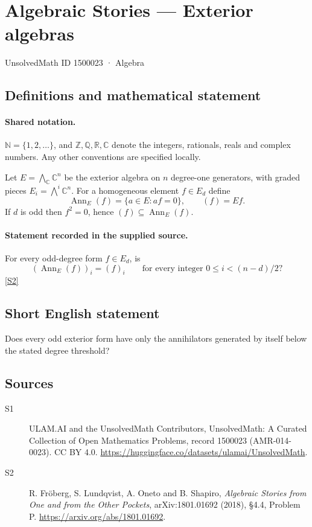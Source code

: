 \documentclass[11pt]{article}
\newcommand{\sref}[2]{\hyperlink{source:#1:#2}{[S#2]}}
\begin{document}
\setcounter{section}{1500022}
\section{Algebraic Stories — Exterior algebras}\label{1500023}
{\small\sffamily UnsolvedMath ID 1500023 · Algebra}
\subsection{Definitions and mathematical statement}

\paragraph{Shared notation.}$\mathbb N=\{1,2,\ldots\}$, and $\mathbb Z,\mathbb Q,\mathbb R,\mathbb C$ denote the integers, rationals, reals and complex numbers. Any other conventions are specified locally.


Let $E=\bigwedge_{\mathbb C}\mathbb C^n$ be the exterior algebra on $n$ degree-one generators, with graded pieces $E_i=\bigwedge^i\mathbb C^n$. For a homogeneous element $f\in E_d$ define
\[\operatorname{Ann}_E(f)=\{a\in E:af=0\},\qquad (f)=Ef.
\]
If $d$ is odd then $f^2=0$, hence $(f)\subseteq\operatorname{Ann}_E(f)$.
\paragraph{Statement recorded in the supplied source.}
For every odd-degree form $f\in E_d$, is
\[(\operatorname{Ann}_E(f))_i=(f)_i\qquad\text{for every integer }0\leq i<(n-d)/2?\] \sref{1500023}{2}
\subsection{Short English statement}
Does every odd exterior form have only the annihilators generated by itself below the stated degree threshold?
\subsection{Sources}
\begin{description}
\item[\hypertarget{source:1500023:1}{S1}] ULAM.AI and the UnsolvedMath Contributors, UnsolvedMath: A Curated Collection of Open Mathematics Problems, record 1500023 (AMR-014-0023). CC BY 4.0. \url{https://huggingface.co/datasets/ulamai/UnsolvedMath}.
\item[\hypertarget{source:1500023:2}{S2}] R. Fröberg, S. Lundqvist, A. Oneto and B. Shapiro, \emph{Algebraic Stories from One and from the Other Pockets}, arXiv:1801.01692 (2018), §4.4, Problem P. \url{https://arxiv.org/abs/1801.01692}.
\end{description}
\label{end:1500023}
\end{document}
